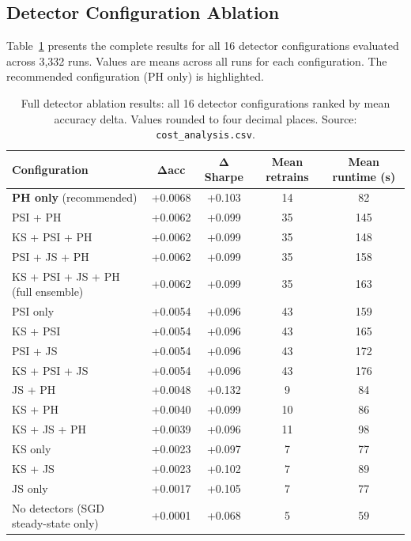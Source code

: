 \begin{appendices}
\section{Detector Configuration Ablation}

Table~\ref{tab:ablation_full} presents the complete results for all 16 detector
configurations evaluated across 3{,}332 runs.  Values are means across all runs for
each configuration.  The recommended configuration (PH only) is highlighted.

\begin{table}[htbp]
  \centering
  \caption{Full detector ablation results: all 16 detector configurations ranked by mean
    accuracy delta.  Values rounded to four decimal places.
    Source: \texttt{cost\_analysis.csv}.}
  \label{tab:ablation_full}
  \small
  \begin{tabular}{lcccc}
    \hline
    \textbf{Configuration} & $\bm{\Delta}$\textbf{acc} & $\bm{\Delta}$\textbf{Sharpe}
      & \textbf{Mean retrains} & \textbf{Mean runtime (s)} \\
    \hline
    \textbf{PH only} (recommended)        & +0.0068 & +0.103 & 14 &  82 \\
    PSI + PH                              & +0.0062 & +0.099 & 35 & 145 \\
    KS + PSI + PH                         & +0.0062 & +0.099 & 35 & 148 \\
    PSI + JS + PH                         & +0.0062 & +0.099 & 35 & 158 \\
    KS + PSI + JS + PH (full ensemble)    & +0.0062 & +0.099 & 35 & 163 \\
    PSI only                              & +0.0054 & +0.096 & 43 & 159 \\
    KS + PSI                              & +0.0054 & +0.096 & 43 & 165 \\
    PSI + JS                              & +0.0054 & +0.096 & 43 & 172 \\
    KS + PSI + JS                         & +0.0054 & +0.096 & 43 & 176 \\
    JS + PH                               & +0.0048 & +0.132 &  9 &  84 \\
    KS + PH                               & +0.0040 & +0.099 & 10 &  86 \\
    KS + JS + PH                          & +0.0039 & +0.096 & 11 &  98 \\
    KS only                               & +0.0023 & +0.097 &  7 &  77 \\
    KS + JS                               & +0.0023 & +0.102 &  7 &  89 \\
    JS only                               & +0.0017 & +0.105 &  7 &  77 \\
    No detectors (SGD steady-state only)  & +0.0001 & +0.068 &  5 &  59 \\
    \hline
  \end{tabular}
\end{table}


\end{appendices}

